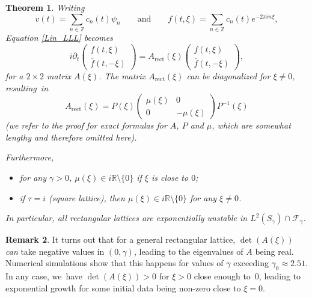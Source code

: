 \documentclass[JEP,XML,SOM,Unicode,NoFloatCountersInSection,published]{cedram}
\newtheorem{theorem}{Theorem}[section]
\theoremstyle{definition}
\newtheorem{remark}[theorem]{Remark}
\newcommand\Z{\mathbb Z}
\begin{document}
\begin{theorem}
\label{thmunstable}
Writing
\[
v(t) = \sum_{n \in \Z} c_n(t) \psi_n \qquad \text{and} \qquad
f(t,\xi) = \sum_{n \in \Z} c_n(t) e^{-2\pi i n\xi},
\]
Equation \eqref{Lin_LLL} becomes
\[
i \partial_t \begin{pmatrix} {f}(t,\xi) \\[2pt] \overline{{f}}(t,-\xi) \end{pmatrix} = A_{\mathrm{rect}}(\xi) \begin{pmatrix} {f}(t,\xi) \\[2pt] \overline{{f}}(t,-\xi) \end{pmatrix},
\]
for a $2\times 2$ matrix $A(\xi)$. The matrix $A_{\mathrm{rect}}(\xi) $ can be diagonalized for $\xi \neq 0$, resulting~in
\[
A_{\mathrm{rect}}(\xi) = P(\xi) \begin{pmatrix} \mu(\xi) & 0 \\[2pt] 0 & -\mu(\xi) \end{pmatrix} P^{-1}(\xi)
\]
(we refer to the proof for exact formulas for $A$, $P$ and $\mu$, which are somewhat lengthy and therefore omitted here).

Furthermore,
\begin{itemize}
\item for any $\gamma>0$, $\mu(\xi) \in i \mathbb{R} \setminus\{ 0 \}$ if $\xi$ is close to $0$;
\item if $\tau = i$ (square lattice), then $\mu(\xi) \in i \mathbb{R} \setminus\{ 0 \}$ for any $\xi \neq 0$.
\end{itemize}

In particular, all rectangular lattices are exponentially unstable in $L^2(S_\gamma) \cap \mathcal{F}_\gamma$.
\end{theorem}

\begin{remark}
It turns out that for a general rectangular lattice, $\det(A(\xi))$ \emph{can} take negative values in $(0,\gamma)$, leading to the eigenvalues of $A$ being real. Numerical simulations show that this happens for values of $\gamma$ exceeding $\gamma_0 \approx 2.51$. In any case, we~have $\det(A(\xi)) > 0$ for $\xi >0$ close enough to~$0$, leading to exponential growth for some initial data being non-zero close to $\xi = 0$.
\end{remark}
\end{document}
